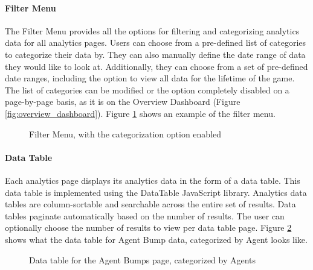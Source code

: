 \paragraph{Filter Menu}

The Filter Menu provides all the options for filtering and categorizing analytics data for all analytics pages. Users can choose from a pre-defined list of categories to categorize their data by. They can also manually define the date range of data they would like to look at. Additionally, they can choose from a set of pre-defined date ranges, including the option to view all data for the lifetime of the game. The list of categories can be modified or the option completely disabled on a page-by-page basis, as it is on the Overview Dashboard (Figure \ref{fig:overview_dashboard}). Figure \ref{fig:filter_menu} shows an example of the filter menu. 

\begin{figure}[hbt]
	\caption[Analytics Site: Filter Menu]{\label{fig:filter_menu} Filter Menu, with the categorization option enabled}
\end{figure}

\paragraph{Data Table}

Each analytics page displays its analytics data in the form of a data table. This data table is implemented using the DataTable JavaScript library. Analytics data tables are column-sortable and searchable across the entire set of results. Data tables paginate automatically based on the number of results. The user can optionally choose the number of results to view per data table page. Figure \ref{fig:data_table} shows what the data table for Agent Bump data, categorized by Agent looks like. 

\begin{figure}[hbt]
	\caption[Analytics Site: Agent Bumps Data Table]{\label{fig:data_table} Data table for the Agent Bumps page, categorized by Agents}
\end{figure}

